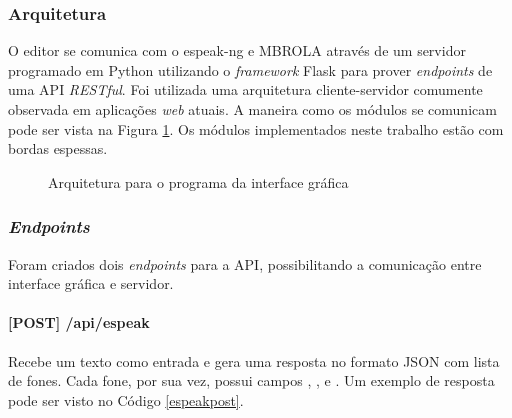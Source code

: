 \subsubsection{Arquitetura}
 O editor se comunica com o espeak-ng e MBROLA através de um
servidor programado em Python utilizando o \emph{framework} Flask para prover
\emph{endpoints} de uma API \emph{RESTful}. Foi utilizada uma arquitetura
cliente-servidor \cite{rest} comumente observada em aplicações \emph{web}
atuais. A maneira como os módulos se comunicam pode ser vista na Figura
\ref{fig:arch}. Os módulos implementados neste trabalho estão com bordas
espessas.

\begin{figure}[!htbp]
\centering
{}
\caption{Arquitetura para o programa da interface gráfica}
\label{fig:arch}
\end{figure}

\subsubsection{\emph{Endpoints}}
Foram criados dois \emph{endpoints} para a API, possibilitando a comunicação entre
interface gráfica e servidor.

\paragraph{[POST] /api/espeak} Recebe um texto como entrada e gera uma resposta
no formato JSON com lista de fones. Cada fone, por sua vez, possui campos ,
,  e . Um exemplo de resposta pode ser visto no Código \ref{espeakpost}.
